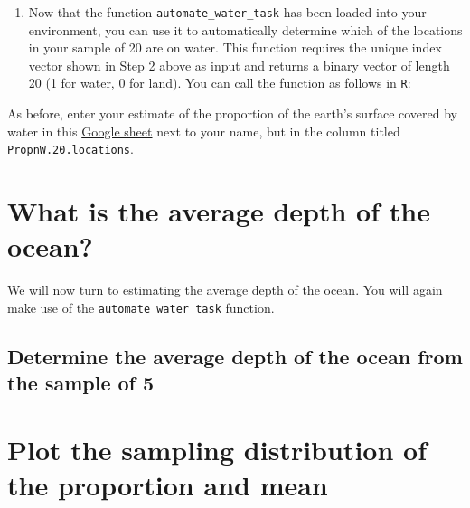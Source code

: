 \documentclass[letterpaper,9pt,twoside,printwatermark=false]{pinp}
\providecommand{\tightlist}{%
  \setlength{\itemsep}{0pt}\setlength{\parskip}{0pt}}
\begin{document}
\begin{enumerate}
\def\labelenumi{\arabic{enumi}.}
\setcounter{enumi}{3}
\tightlist
\item
  Now that the function \texttt{automate\_water\_task} has been loaded
  into your environment, you can use it to automatically determine which
  of the locations in your sample of 20 are on water. This function
  requires the unique index vector shown in Step 2 above as input and
  returns a binary vector of length 20 (1 for water, 0 for land). You
  can call the function as follows in \texttt{R}:
\end{enumerate}

\begin{Shaded}
\begin{Highlighting}[]
\StringTok{ }\NormalTok{(}\NormalTok{)}
\end{Highlighting}
\end{Shaded}

As before, enter your estimate of the proportion of the earth's surface
covered by water in this
\href{https://docs.google.com/spreadsheets/d/1Mnxeq9nQcTdQycZ7S_62fYFiNC5_a3fibsyodzfwO58/edit?usp=sharing}{Google
sheet} next to your name, but in the column titled
\texttt{PropnW.20.locations}.

\section{What is the average depth of the
ocean?}\label{what-is-the-average-depth-of-the-ocean}

We will now turn to estimating the average depth of the ocean. You will
again make use of the \texttt{automate\_water\_task} function.

\subsection{Determine the average depth of the ocean from the sample of
5}\label{determine-the-average-depth-of-the-ocean-from-the-sample-of-5}

\section{Plot the sampling distribution of the proportion and
mean}\label{plot-the-sampling-distribution-of-the-proportion-and-mean}
\end{document}
